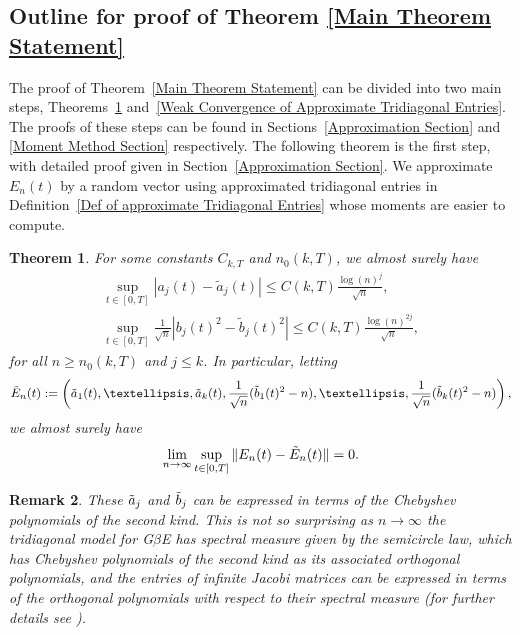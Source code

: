 \documentclass{amsart}
\newtheorem{thm}{Theorem}[section]
\newtheorem{rmk}[thm]{Remark}
\numberwithin{equation}{section}
\begin{document}
\subsection{Outline for proof of Theorem \ref{Main Theorem Statement}}
The proof of Theorem~\ref{Main Theorem Statement} can be divided into two main steps, Theorems~\ref{Entry Approximation Thm} and~\ref{Weak Convergence of Approximate Tridiagonal Entries}. The proofs of these steps can be found in Sections~\ref{Approximation Section} and \ref{Moment Method Section} respectively. The following theorem is the first step, with detailed proof given in Section~\ref{Approximation Section}. We approximate $E_n(t)$ by a random vector using approximated tridiagonal entries in Definition~\ref{Def of approximate Tridiagonal Entries} whose moments are easier to compute. 
\begin{thm}\label{Entry Approximation Thm}
    For some constants $C_{k,T}$ and $n_0(k,T)$, we almost surely have 
    \begin{gather*}
        \sup_{t \in [0,T]}|a_j(t)-\tilde{a}_j(t)| \leq C(k,T)\frac{\log(n)^j}{\sqrt{n}},\\        
        \sup_{t \in [0,T]}\frac{1}{\sqrt{n}}\left|b_j(t)^2-\tilde{b}_j(t)^2\right| \leq C(k,T)\frac{\log(n)^{2j}}{\sqrt{n}},
    \end{gather*}
    for all $n \geq n_0(k,T)$ and $j \leq k$. In particular, letting 
    \begin{equation*}
    \Tilde{E}_n(t):=\left(\Tilde{a}_1(t),\dots,\Tilde{a}_k(t), \frac{1}{\sqrt{n}}(\Tilde{b}_1(t)^2-n),\dots,\frac{1}{\sqrt{n}}(\Tilde{b}_k(t)^2-n)\right),
    \end{equation*}
    we almost surely have
    \begin{equation}
        \lim_{n \to \infty} \sup_{t \in [0,T]} \|E_n(t)-\Tilde{E}_n(t)\|=0.
    \end{equation}
\end{thm}
\begin{rmk}
    These $\Tilde{a}_j$ and $\Tilde{b}_j$ can be expressed in terms of the Chebyshev polynomials of the second kind. This is not so surprising as $n \to \infty$ the tridiagonal model for G$\beta$E has spectral measure given by the semicircle law, which has Chebyshev polynomials of the second kind as its associated orthogonal polynomials, and the entries of infinite Jacobi matrices can be expressed in terms of the orthogonal polynomials with respect to their spectral measure (for further details see \cite{deift2000orthogonal}).
\end{rmk}
\end{document}
